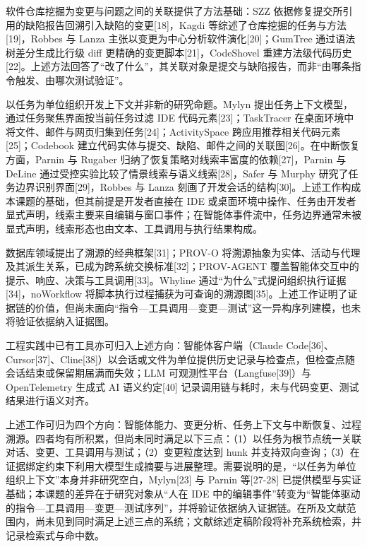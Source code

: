 
软件仓库挖掘为变更与问题之间的关联提供了方法基础：SZZ 依据修复提交所引用的缺陷报告回溯引入缺陷的变更[18]，Kagdi 等综述了仓库挖掘的任务与方法[19]，Robbes 与 Lanza 主张以变更为中心分析软件演化[20]；GumTree 通过语法树差分生成比行级 diff 更精确的变更脚本[21]，CodeShovel 重建方法级代码历史[22]。上述方法回答了“改了什么”，其关联对象是提交与缺陷报告，而非“由哪条指令触发、由哪次测试验证”。


以任务为单位组织开发上下文并非新的研究命题。Mylyn 提出任务上下文模型，通过任务聚焦界面按当前任务过滤 IDE 代码元素[23]；TaskTracer 在桌面环境中将文件、邮件与网页归集到任务[24]；ActivitySpace 跨应用推荐相关代码元素[25]；Codebook 建立代码实体与提交、缺陷、邮件之间的关联图[26]。在中断恢复方面，Parnin 与 Rugaber 归纳了恢复策略对线索丰富度的依赖[27]，Parnin 与 DeLine 通过受控实验比较了情景线索与语义线索[28]，Safer 与 Murphy 研究了任务边界识别界面[29]，Robbes 与 Lanza 刻画了开发会话的结构[30]。上述工作构成本课题的基础，但其前提是开发者直接在 IDE 或桌面环境中操作、任务由开发者显式声明，线索主要来自编辑与窗口事件；在智能体事件流中，任务边界通常未被显式声明，线索形态也由文本、工具调用与执行结果构成。


数据库领域提出了溯源的经典框架[31]；PROV-O 将溯源抽象为实体、活动与代理及其派生关系，已成为跨系统交换标准[32]；PROV-AGENT 覆盖智能体交互中的提示、响应、决策与工具调用[33]。Whyline 通过“为什么”式提问组织执行证据[34]，noWorkflow 将脚本执行过程捕获为可查询的溯源图[35]。上述工作证明了证据链的价值，但尚未面向“指令—工具调用—变更—测试”这一异构序列建模，也未将验证依据纳入证据图。


工程实践中已有工具亦可归入上述方向：智能体客户端（Claude Code[36]、Cursor[37]、Cline[38]）以会话或文件为单位提供历史记录与检查点，但检查点随会话结束或保留期届满而失效；LLM 可观测性平台（Langfuse[39]）与 OpenTelemetry 生成式 AI 语义约定[40] 记录调用链与耗时，未与代码变更、测试结果进行语义对齐。

上述工作可归为四个方向：智能体能力、变更分析、任务上下文与中断恢复、过程溯源。四者均有所积累，但尚未同时满足以下三点：（1）以任务为根节点统一关联对话、变更、工具调用与测试；（2）变更粒度达到 hunk 并支持双向查询；（3）在证据绑定约束下利用大模型生成摘要与进展整理。需要说明的是，“以任务为单位组织上下文”本身并非研究空白，Mylyn[23] 与 Parnin 等[27-28] 已提供模型与实证基础；本课题的差异在于研究对象从“人在 IDE 中的编辑事件”转变为“智能体驱动的指令—工具调用—变更—测试序列”，并将验证依据纳入证据链。在所及文献范围内，尚未见到同时满足上述三点的系统；文献综述定稿阶段将补充系统检索，并记录检索式与命中数。

